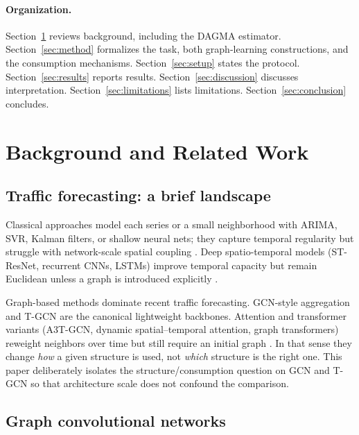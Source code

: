 \paragraph{Organization.}
Section~\ref{sec:background} reviews background, including the DAGMA
estimator. Section~\ref{sec:method} formalizes the task, both graph-learning
constructions, and the consumption mechanisms. Section~\ref{sec:setup}
states the protocol. Section~\ref{sec:results} reports results.
Section~\ref{sec:discussion} discusses interpretation.
Section~\ref{sec:limitations} lists limitations.
Section~\ref{sec:conclusion} concludes.

\section{Background and Related Work}\label{sec:background}

\subsection{Traffic forecasting: a brief landscape}\label{sec:bg-landscape}

Classical approaches model each series or a small neighborhood with ARIMA,
SVR, Kalman filters, or shallow neural nets; they capture temporal
regularity but struggle with network-scale spatial coupling
\citep{Hamed1995Short,Smola2004A,Lippi2013Short,akhtar2021review}. Deep
spatio-temporal models (ST-ResNet, recurrent CNNs, LSTMs) improve temporal
capacity but remain Euclidean unless a graph is introduced explicitly
\citep{Zhang2016Deep,Cao2017Interactive}.

Graph-based methods dominate recent traffic forecasting. GCN-style
aggregation \citep{kipf2017semi} and T-GCN \citep{zhao2019t} are the
canonical lightweight backbones. Attention and transformer variants
(A3T-GCN, dynamic spatial--temporal attention, graph transformers) reweight
neighbors over time but still require an initial graph
\citep{A3T-GCN,Sun2023Attention}. In that sense they change \emph{how} a
given structure is used, not \emph{which} structure is the right one. This
paper deliberately isolates the structure/consumption question on GCN and
T-GCN so that architecture scale does not confound the comparison.

\subsection{Graph convolutional networks}\label{sec:bg-gcn}

